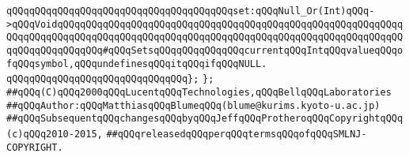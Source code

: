 \verb|qQQqqQQqqQQqqQQqqQQqqQQqqQQqqQQqqQQqqQQqset:qQQqNull_Or(Int)qQQq->qQQqVoidqQQqqQQqqQQqqQQqqQQqqQQqqQQqqQQqqQQqqQQqqQQqqQQqqQQqqQQqqQQqqQQqqQQqqQQqqQQqqQQqqQQqqQQqqQQqqQQqqQQqqQQqqQQqqQQqqQQqqQQqqQQqqQQqqQQqqQQqqQQqqQQqqQQq#qQQqSetsqQQqqQQqqQQqqQQqcurrentqQQqIntqQQqvalueqQQqofqQQqsymbol,qQQqundefinesqQQqitqQQqifqQQqNULL.|\newline
\verb|qQQqqQQqqQQqqQQqqQQqqQQqqQQqqQQq};|\newline
\verb|};|\newline
\newline
\newline
\newline
\verb|##qQQq(C)qQQq2000qQQqLucentqQQqTechnologies,qQQqBellqQQqLaboratories|\newline
\verb|##qQQqAuthor:qQQqMatthiasqQQqBlumeqQQq(blume@kurims.kyoto-u.ac.jp)|\newline
\verb|##qQQqSubsequentqQQqchangesqQQqbyqQQqJeffqQQqProtheroqQQqCopyrightqQQq(c)qQQq2010-2015,|\newline
\verb|##qQQqreleasedqQQqperqQQqtermsqQQqofqQQqSMLNJ-COPYRIGHT.|\newline

